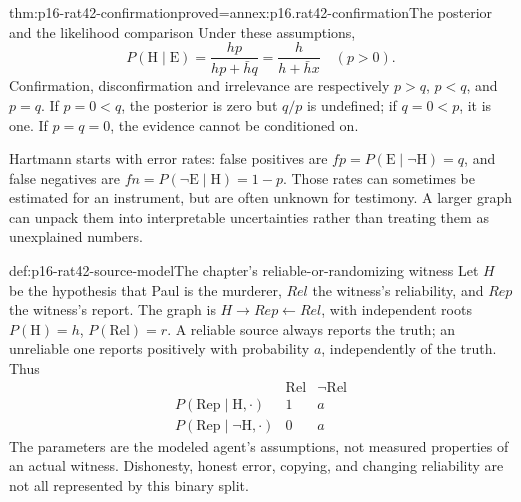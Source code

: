 \begin{hblemma}{thm:p16-rat42-confirmation}{proved=annex:p16.rat42-confirmation}{The posterior and the likelihood comparison}
Under these assumptions,
\[
 P(\mathrm H\mid\mathrm E)=\frac{hp}{hp+\bar hq}
     =\frac{h}{h+\bar h x}\quad(p>0).
\]
Confirmation, disconfirmation and irrelevance are respectively
\(p>q\), \(p<q\), and \(p=q\). If \(p=0<q\), the
posterior is zero but \(q/p\) is undefined; if \(q=0<p\),
it is one. If \(p=q=0\), the evidence cannot be conditioned on.
\end{hblemma}

Hartmann starts with error rates: false positives are
\(fp=P(\mathrm E\mid\neg\mathrm H)=q\), and false negatives
are \(fn=P(\neg\mathrm E\mid\mathrm H)=1-p\).
Those rates can sometimes be estimated for an instrument, but are often
unknown for testimony. A larger graph can unpack them into interpretable
uncertainties rather than treating them as unexplained numbers.
\cite[Sec.~3.3, pp.~257--259]{Hartmann2021BayesNets}

\begin{hbdefinition}{def:p16-rat42-source-model}{The chapter's reliable-or-randomizing witness}
Let \(H\) be the hypothesis that Paul is the murderer, \(Rel\)
the witness's reliability, and \(Rep\) the witness's report.
The graph is \(H\to Rep\leftarrow Rel\), with independent roots
\(P(\mathrm H)=h\), \(P(\mathrm{Rel})=r\). A reliable source
always reports the truth; an unreliable one reports positively with
probability \(a\), independently of the truth. Thus
\[
\begin{array}{c|cc}
 &\mathrm{Rel}&\neg\mathrm{Rel}\\\hline
 P(\mathrm{Rep}\mid\mathrm H,\cdot)&1&a\\
 P(\mathrm{Rep}\mid\neg\mathrm H,\cdot)&0&a
\end{array}
\]
The parameters are the modeled agent's assumptions, not measured
properties of an actual witness. Dishonesty, honest error, copying,
and changing reliability are not all represented by this binary split.
\end{hbdefinition}

